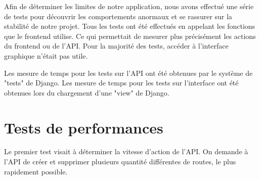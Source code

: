 





Afin de déterminer les limites de notre application, nous avons effectué une série de tests pour découvrir les comportements anormaux et se rassurer sur la stabilité de notre projet.\newline
Tous les tests ont été effectués en appelant les fonctions que le frontend utilise. Ce qui permettait de mesurer plus précisément les actions du frontend ou de l'API. Pour la majorité des tests, accéder à l'interface graphique n'était pas utile.

Les mesure de temps pour les tests sur l'API ont été obtenues par le système de "tests" de Django. 
Les mesure de temps pour les tests sur l'interface ont été obtenues lors du chargement d'une "view" de Django.

\newpage

\section{Tests de performances}

Le premier test visait à déterminer la vitesse d'action de l'API.\newline
On demande à l'API de créer et supprimer plusieurs quantité différentes de routes, le plus rapidement possible.\newline


